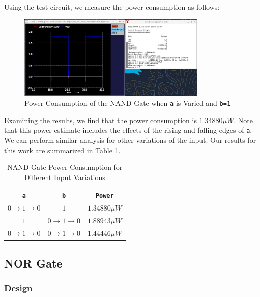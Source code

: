 \documentclass[fleqn]{article}
\begin{document}
	\noindent Using the test circuit, we measure the power consumption as follows:
	
	\begin{figure}[H]
		\centerline{\includegraphics[width=0.8\textwidth]{nand_power_sweep_va.png}}
		\caption{Power Consumption of the NAND Gate when \texttt{a} is Varied and \texttt{b=1}}
		\label{fig::nand_power_sweep_va}
	\end{figure}
	
	\noindent Examining the results, we find that the power consumption is $1.34880{\mu}W$. Note that this power estimate includes the effects of the rising and falling edges of \texttt{a}. We can perform similar analysis for other variations of the input. Our results for this work are summarized in Table \ref{table::nand_gate_power_analysis}.
	
	\begin{table}[H]
	\begin{center}
	\caption{NAND Gate Power Consumption for Different Input Variations}
	\label{table::nand_gate_power_analysis}
	\begin{tabular}{| c | c | c |}
		\hline
		\texttt{a} & \texttt{b} & \texttt{Power}\\
		\hline	
		$0 \rightarrow 1 \rightarrow 0$ & $1$ & $1.34880{\mu}W$ \\
		\hline	
		$1$ & $0 \rightarrow 1 \rightarrow 0$ & $1.88943{\mu}W$ \\
		\hline	
		$0 \rightarrow 1 \rightarrow 0$ & $0 \rightarrow 1 \rightarrow 0$ & $1.44446{\mu}W$\\
		\hline
	\end{tabular}
	\end{center}
	\end{table}
	
	\subsection{NOR Gate}
	
	\subsubsection{Design}
	
\end{document}

